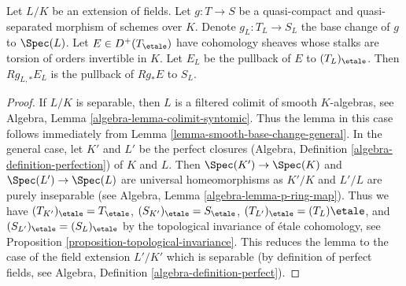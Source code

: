 \begin{lemma}
\label{lemma-base-change-field-extension}
Let $L/K$ be an extension of fields. Let $g : T \to S$ be a quasi-compact
and quasi-separated morphism of schemes over $K$. Denote
$g_L : T_L \to S_L$ the base change of $g$ to $\Spec(L)$.
Let $E \in D^+(T_\etale)$ have cohomology sheaves whose stalks
are torsion of orders invertible in $K$. Let $E_L$ be the
pullback of $E$ to $(T_L)_\etale$. Then
$Rg_{L, *}E_L$ is the pullback of $Rg_*E$ to $S_L$.
\end{lemma}

\begin{proof}
If $L/K$ is separable, then $L$ is a filtered colimit of smooth
$K$-algebras, see
Algebra, Lemma \ref{algebra-lemma-colimit-syntomic}.
Thus the lemma in this case follows immediately from
Lemma \ref{lemma-smooth-base-change-general}.
In the general case, let $K'$ and $L'$ be the perfect closures
(Algebra, Definition \ref{algebra-definition-perfection})
of $K$ and $L$. Then $\Spec(K') \to \Spec(K)$ and
$\Spec(L') \to \Spec(L)$ are universal homeomorphisms
as $K'/K$ and $L'/L$ are purely inseparable
(see Algebra, Lemma \ref{algebra-lemma-p-ring-map}).
Thus we have $(T_{K'})_\etale = T_\etale$,
$(S_{K'})_\etale = S_\etale$,
$(T_{L'})_\etale = (T_L)\etale$, and
$(S_{L'})_\etale = (S_L)_\etale$ by
the topological invariance of \'etale cohomology, see
Proposition \ref{proposition-topological-invariance}.
This reduces the lemma to the case of the field
extension $L'/K'$ which is separable (by definition of
perfect fields, see Algebra, Definition \ref{algebra-definition-perfect}).
\end{proof}
